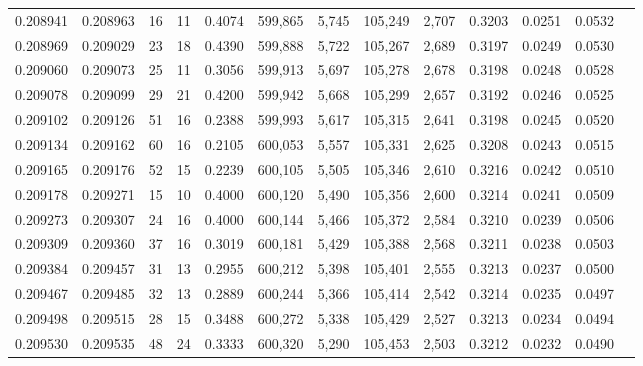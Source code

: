 \begin{tabular}{rrrrrrrrrrrrr}
0.208941 & 0.208963 &    16 &  11 &                                     0.4074 & 599,865 &   5,745 & 105,249 &   2,707 & 0.3203 & 0.0251 & 0.0532 \\
0.208969 & 0.209029 &    23 &  18 &                                     0.4390 & 599,888 &   5,722 & 105,267 &   2,689 & 0.3197 & 0.0249 & 0.0530 \\
0.209060 & 0.209073 &    25 &  11 &                                     0.3056 & 599,913 &   5,697 & 105,278 &   2,678 & 0.3198 & 0.0248 & 0.0528 \\
0.209078 & 0.209099 &    29 &  21 &                                     0.4200 & 599,942 &   5,668 & 105,299 &   2,657 & 0.3192 & 0.0246 & 0.0525 \\
0.209102 & 0.209126 &    51 &  16 &                                     0.2388 & 599,993 &   5,617 & 105,315 &   2,641 & 0.3198 & 0.0245 & 0.0520 \\
0.209134 & 0.209162 &    60 &  16 &                                     0.2105 & 600,053 &   5,557 & 105,331 &   2,625 & 0.3208 & 0.0243 & 0.0515 \\
0.209165 & 0.209176 &    52 &  15 &                                     0.2239 & 600,105 &   5,505 & 105,346 &   2,610 & 0.3216 & 0.0242 & 0.0510 \\
0.209178 & 0.209271 &    15 &  10 &                                     0.4000 & 600,120 &   5,490 & 105,356 &   2,600 & 0.3214 & 0.0241 & 0.0509 \\
0.209273 & 0.209307 &    24 &  16 &                                     0.4000 & 600,144 &   5,466 & 105,372 &   2,584 & 0.3210 & 0.0239 & 0.0506 \\
0.209309 & 0.209360 &    37 &  16 &                                     0.3019 & 600,181 &   5,429 & 105,388 &   2,568 & 0.3211 & 0.0238 & 0.0503 \\
0.209384 & 0.209457 &    31 &  13 &                                     0.2955 & 600,212 &   5,398 & 105,401 &   2,555 & 0.3213 & 0.0237 & 0.0500 \\
0.209467 & 0.209485 &    32 &  13 &                                     0.2889 & 600,244 &   5,366 & 105,414 &   2,542 & 0.3214 & 0.0235 & 0.0497 \\
0.209498 & 0.209515 &    28 &  15 &                                     0.3488 & 600,272 &   5,338 & 105,429 &   2,527 & 0.3213 & 0.0234 & 0.0494 \\
0.209530 & 0.209535 &    48 &  24 &                                     0.3333 & 600,320 &   5,290 & 105,453 &   2,503 & 0.3212 & 0.0232 & 0.0490 \\

\end{tabular}
